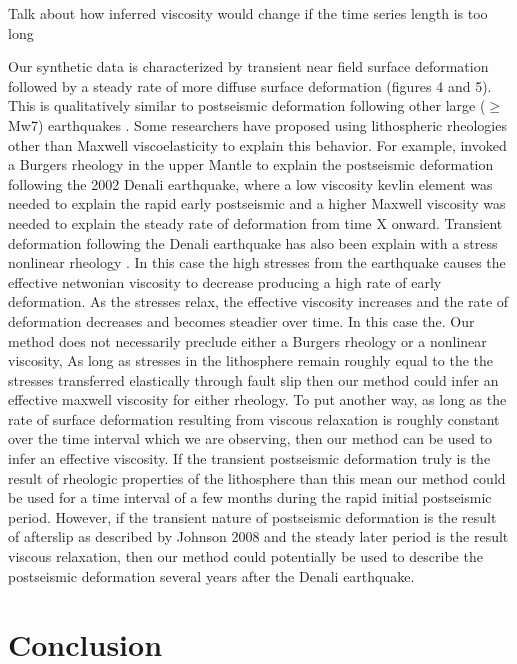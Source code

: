 \documentclass[extra]{gji}
\begin{document}
Talk about how inferred viscosity would change if the time series length is too long

Our synthetic data is characterized by transient near field surface
deformation followed by a steady rate of more diffuse surface
deformation (figures 4 and 5).  This is qualitatively similar to
postseismic deformation following other large ($\geq$ Mw7) earthquakes
\citep[e.g.][]{E2009}.  Some researchers have proposed using
lithospheric rheologies other than Maxwell viscoelasticity to explain
this behavior.  For example, \citet{P2005} invoked a
Burgers rheology in the upper Mantle to explain the postseismic
deformation following the 2002 Denali earthquake, where a low viscosity kevlin
element was needed to explain the rapid early postseismic and a higher
Maxwell viscosity was needed to explain the steady rate of deformation
from time X onward.  Transient deformation following the Denali earthquake has also been explain with
a stress nonlinear rheology \citep{F2006b}.  In this case the high
stresses from the earthquake causes the effective netwonian viscosity
to decrease producing a high rate of early deformation.  As the
stresses relax, the effective viscosity increases and the rate of
deformation decreases and becomes steadier over time.  In this case
the. Our method does not necessarily preclude either a Burgers
rheology or a nonlinear viscosity, As long as stresses in the
lithosphere remain roughly equal to the the stresses transferred
elastically through fault slip then our method could infer an
effective maxwell viscosity for either rheology.  To put another way,
as long as the rate of surface deformation resulting from viscous
relaxation is roughly constant over the time interval which we are
observing, then our method can be used to infer an effective
viscosity. If the transient postseismic deformation truly is the
result of rheologic properties of the lithosphere than this mean our
method could be used for a time interval of a few months during the
rapid initial postseismic period. However, if the transient nature of
postseismic deformation is the result of afterslip as described by Johnson 2008
and the steady later period is the result viscous relaxation, then our
method could potentially be used to describe the postseismic
deformation several years after the Denali earthquake.

\section{Conclusion}
\end{document}
